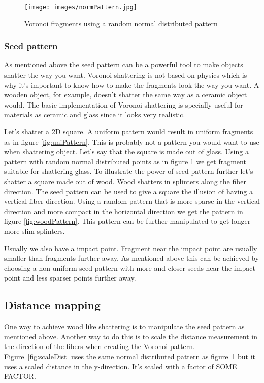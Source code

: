 \documentclass[10pt]{article}
\begin{document}
\begin{figure}
    \centering
    \texttt{[image: images/normPattern.jpg]}
    \caption{Voronoi fragments using a random normal distributed pattern}
    \label{fig:normPattern}
\end{figure}

\subsubsection{Seed pattern}
As mentioned above the seed pattern can be a powerful tool to make objects
shatter the way you want. Voronoi shattering is not based on physics which is
why it's important to know how to make the fragments look the way you want.
A wooden object, for example, doesn't shatter the same way as a ceramic object
would. The basic implementation of Voronoi shattering is specially useful for
materials as ceramic and glass since it looks very realistic.

Let's shatter a 2D square. A uniform pattern would result in uniform fragments
as in figure \ref{fig:uniPattern}. This is probably not a pattern you would
want to use when shattering object. Let's say that the square is made out of
glass. Using a pattern with random normal distributed points as in figure
\ref{fig:normPattern} we get fragment suitable for shattering glass. To
illustrate the power of seed pattern further let's shatter a square made out
of wood. Wood shatters in splinters along the fiber direction. The seed pattern
can be used to give a square the illusion of having a vertical fiber direction.
Using a random pattern that is more sparse in the vertical direction and more
compact in the horizontal direction we get the pattern in figure \ref{fig:woodPattern}.
This pattern can be further manipulated to get longer more slim splinters.

Usually we also have a impact point. Fragment near the impact point are usually
smaller than fragments further away. As mentioned above this can be achieved
by choosing a non-uniform seed pattern with more and closer seeds near the impact
point and less sparser points further away.

\subsection{Distance mapping}
One way to achieve wood like shattering is to manipulate the seed pattern as
mentioned above. Another way to do this is to scale the distance measurement
in the direction of the fibers when creating the Voronoi pattern.
Figure~\ref{fig:scaleDist} uses the same normal distributed pattern as
figure~\ref{fig:normPattern} but it uses a scaled distance in the y-direction.
It's scaled with a factor of SOME FACTOR.
\end{document}
